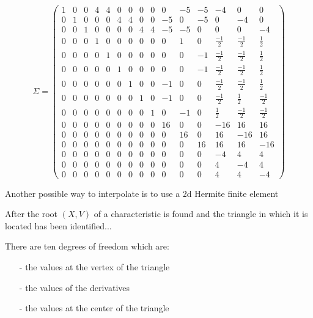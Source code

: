 \documentclass[proc]{edpsmath}
\begin{document}
  
\begin{equation*}
\Sigma = 
\begin{pmatrix}
	1 & 0 & 0 & 4 & 4 & 0 & 0 & 0 & 0 & 0 & -5 & -5 & -4 & 0 & 0  \\
	0 & 1 & 0 & 0 & 0 & 4 & 4 & 0 & 0 & -5 &  0 & -5 & 0 & -4 & 0  \\
	0 & 0 & 1 & 0 & 0 & 0 & 0 & 4 & 4 & -5 & -5 &  0 & 0 & 0 & -4  \\
	0 & 0 & 0 & 1 & 0 & 0 & 0 & 0 & 0 &  0 &  1 &  0 & \frac{-1}{2} & \frac{-1}{2} & \frac{1}{2}  \\
	0 & 0 & 0 & 0 & 1 & 0 & 0 & 0 & 0 &  0 &  0 & -1 & \frac{-1}{2} & \frac{-1}{2} & \frac{1}{2}  \\
	0 & 0 & 0 & 0 & 0 & 1 & 0 & 0 & 0 &  0 &  0 & -1 & \frac{-1}{2} & \frac{-1}{2} & \frac{1}{2}  \\
	0 & 0 & 0 & 0 & 0 & 0 & 1 & 0 & 0 & -1 &  0 &  0 & \frac{-1}{2} & \frac{-1}{2} & \frac{1}{2}  \\
	0 & 0 & 0 & 0 & 0 & 0 & 0 & 1 & 0 & -1 &  0 &  0 & \frac{-1}{2} & \frac{1}{2} & \frac{-1}{2}  \\
	0 & 0 & 0 & 0 & 0 & 0 & 0 & 0 & 1 &  0 & -1 &  0 & \frac{1}{2} & \frac{-1}{2} & \frac{-1}{2}  \\
	0 & 0 & 0 & 0 & 0 & 0 & 0 & 0 & 0 & 16 &  0 &  0 &-16 & 16 & 16 \\
	0 & 0 & 0 & 0 & 0 & 0 & 0 & 0 & 0 &  0 & 16 &  0 & 16 &-16 & 16 \\
	0 & 0 & 0 & 0 & 0 & 0 & 0 & 0 & 0 &  0 &  0 &  16 & 16 & 16 &-16 \\
	0 & 0 & 0 & 0 & 0 & 0 & 0 & 0 & 0 &  0 &  0 &  0 &-4 & 4 & 4  \\
	0 & 0 & 0 & 0 & 0 & 0 & 0 & 0 & 0 &  0 &  0 &  0 & 4 &-4 & 4  \\
	0 & 0 & 0 & 0 & 0 & 0 & 0 & 0 & 0 &  0 &  0 &  0 & 4 & 4 &-4  
\end{pmatrix}
\end{equation*}

Another possible way to interpolate is to use a 2d Hermite finite element \cite{zie}   

After the root $(X,V)$ of a characteristic is found and  the triangle in which it is located has been identified... 

There are ten degrees of freedom which are:
\begin{itemize}
\item[-] the values at the vertex of the triangle 
\item[-] the values of the derivatives 
\item[-] the values at the center of the triangle 
\end{itemize}
\end{document}
